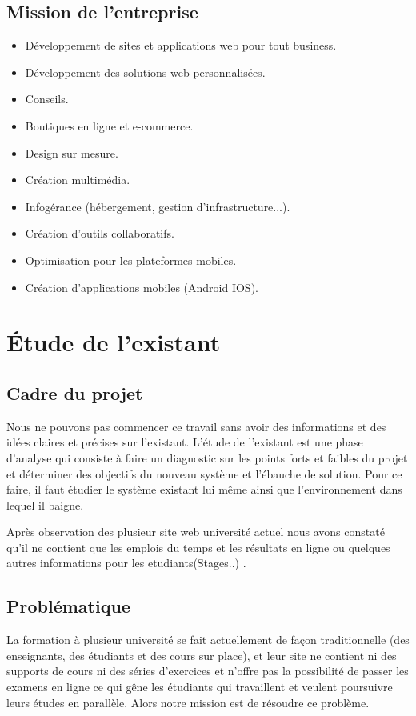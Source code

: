 \subsection{Mission de l'entreprise}
\begin{itemize}
	\item  Développement de sites et applications web pour tout business. 
	\smallskip
	\item Développement des solutions web personnalisées.
	\smallskip
	\item Conseils.
	\smallskip
	\item Boutiques en ligne et e-commerce.
	\smallskip
	\item Design sur mesure.
	\smallskip
	\item Création multimédia.
	\smallskip
	\item Infogérance (hébergement, gestion d’infrastructure...).
	\smallskip
	\item Création d’outils collaboratifs.
	\smallskip
	\item Optimisation pour les plateformes mobiles.
	\smallskip
	\item Création d’applications mobiles (Android IOS).
\end{itemize}

 

\section{Étude de l'existant}
\subsection{Cadre du projet}

Nous ne pouvons pas commencer ce travail sans avoir des informations et des idées claires et précises sur l’existant. L’étude de l’existant est une phase d’analyse qui consiste à faire un diagnostic sur les points forts et faibles du projet et déterminer des objectifs du nouveau système et l’ébauche de solution. Pour ce faire, il faut étudier le système existant lui même ainsi que l’environnement dans lequel il baigne.

\medskip
     
Après observation des plusieur site web université actuel nous avons constaté qu’il ne contient que les emplois du temps et les résultats en ligne ou quelques autres informations pour les etudiants(Stages..) .

\subsection{Problématique}
La formation à plusieur université se fait actuellement de façon traditionnelle (des enseignants, des étudiants et des cours sur place), et leur site ne contient ni des supports de cours ni des séries
d’exercices et n’offre pas la possibilité de passer les examens en ligne ce qui gêne les étudiants qui travaillent et veulent poursuivre leurs études en parallèle.
Alors notre mission est de résoudre
ce problème.

